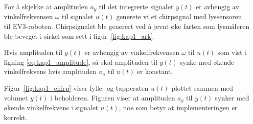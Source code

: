 \documentclass[main.tex]{subfiles}
\begin{document}
For å skjekke at amplituden $a_y$ til det integrerte signalet $y(t)$ er avhengig av vinkelfrekvensen $\omega$ til signalet $u(t)$ generete vi et chirpsignal med lyssensoren til \textsc{EV3}-roboten. Chirpsignalet ble generert ved å jevnt øke farten som lysmåleren ble beveget i sirkel som sett i figur~\ref{fig:kap1_ark}.

Hvis amplituden til $y(t)$ er avhengig av vinkelfrekvensen $\omega$ til $u(t)$ som vist i ligning \eqref{eq:kap1_amplitude}, så skal amplituden til $y(t)$ synke med økende vinkelfrekvens hvis amplituden $a_u$ til $u(t)$ er konstant.

Figur~\ref{fig:kap1_chirp} viser fylle- og tapperaten $u(t)$ plottet sammen med volumet $y(t)$ i beholderen. Figuren viser at amplituden $a_y$ til $y(t)$ synker med økende vinkelfrekvens i signalet $u(t)$, noe som betyr at implementeringen er korrekt.


\end{document}
